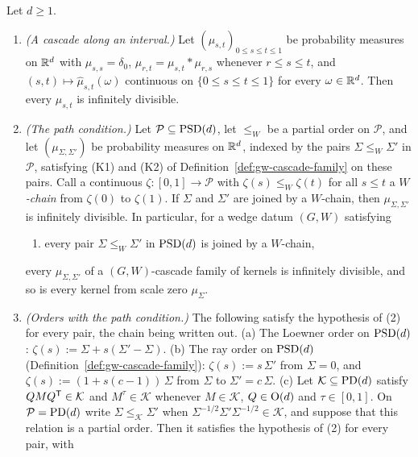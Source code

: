 \begin{theorem}\label{thm:cascade-infinitely-divisible}
Let $d \ge 1$.
\begin{enumerate}
\item \emph{(A cascade along an interval.)} Let $(\mu_{s,t})_{0 \le s \le t \le 1}$ be probability
measures on $\mathbb{R}^d$ with $\mu_{s,s} = \delta_0$, $\mu_{r,t} = \mu_{s,t} * \mu_{r,s}$ whenever
$r \le s \le t$, and $(s,t) \mapsto \widehat\mu_{s,t}(\omega)$ continuous on
$\{0 \le s \le t \le 1\}$ for every $\omega \in \mathbb{R}^d$. Then every $\mu_{s,t}$ is infinitely
divisible.
\item \emph{(The path condition.)} Let $\mathcal P \subseteq \mathrm{PSD}(d)$, let $\le_W$ be a partial order
on $\mathcal P$, and let $(\mu_{\Sigma,\Sigma'})$ be probability measures on $\mathbb{R}^d$, indexed by the
pairs $\Sigma \le_W \Sigma'$ in $\mathcal P$, satisfying (K1) and (K2) of
Definition~\ref{def:gw-cascade-family} on these pairs. Call a continuous $\zeta : [0,1] \to \mathcal P$ with
$\zeta(s) \le_W \zeta(t)$ for all $s \le t$ a \emph{$W$-chain} from $\zeta(0)$ to $\zeta(1)$. If
$\Sigma$ and $\Sigma'$ are joined by a $W$-chain, then $\mu_{\Sigma,\Sigma'}$ is infinitely divisible.
In particular, for a wedge datum $(G, W)$ satisfying
\begin{enumerate}
\item[(P)] every pair $\Sigma \le_W \Sigma'$ in $\mathrm{PSD}(d)$ is joined by a $W$-chain,
\end{enumerate}
every $\mu_{\Sigma,\Sigma'}$ of a $(G, W)$-cascade family of kernels is infinitely divisible, and so
is every kernel from scale zero $\mu_\Sigma$.
\item \emph{(Orders with the path condition.)} The following satisfy the hypothesis of (2) for every
pair, the chain being written out.
(a) The Loewner order on $\mathrm{PSD}(d)$: $\zeta(s) := \Sigma + s(\Sigma' - \Sigma)$.
(b) The ray order on $\mathrm{PSD}(d)$ (Definition~\ref{def:gw-cascade-family}): $\zeta(s) := s\,\Sigma'$ from
$\Sigma = 0$, and $\zeta(s) := (1 + s(c - 1))\,\Sigma$ from $\Sigma$ to $\Sigma' = c\,\Sigma$.
(c) Let $\mathcal K \subseteq \mathrm{PD}(d)$ satisfy $QMQ^{\mathsf{T}} \in \mathcal K$ and $M^\tau \in \mathcal K$
whenever $M \in \mathcal K$, $Q \in \mathrm{O}(d)$ and $\tau \in [0,1]$. On $\mathcal P = \mathrm{PD}(d)$ write
$\Sigma \le_{\mathcal K} \Sigma'$ when $\Sigma^{-1/2}\Sigma'\Sigma^{-1/2} \in \mathcal K$, and suppose
that this relation is a partial order. Then it satisfies the hypothesis of (2) for every pair, with

\end{enumerate}
\end{theorem}
